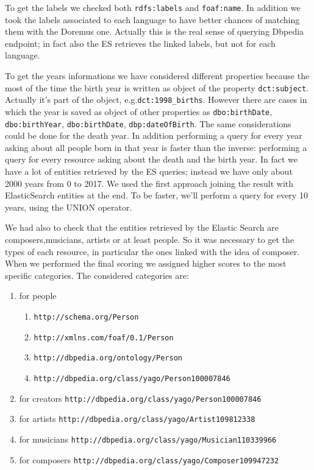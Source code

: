 \documentclass[paper=a4, fontsize=11pt]{scrartcl}
\begin{document}
To get the labels we checked both \verb|rdfs:labels| and \verb|foaf:name|. In addition we took the labels associated to each language to have better chances of matching them with the Doremus one. Actually this is the real sense of querying Dbpedia endpoint; in fact also the ES retrieves the linked labels, but not for each language.

To get the years informations we have considered different properties because the most of the time the birth year is written as object of the property \verb|dct:subject|. Actually it's part of the object, e.g.\verb|dct:1998_births|. However there are cases in which the year is saved as object of other properties as \verb|dbo:birthDate|, \verb|dbo:birthYear|,
\verb|dbo:birthDate|, \verb|dbp:dateOfBirth|.
The same considerations could be done for the death year.
In addition performing a query for every year asking about all people born in that year is faster than the inverse: performing a query for every resource asking about the death and the birth year. In fact we have a lot of entities retrieved by the ES queries; instead we have only about 2000 years from 0 to 2017. We used the first approach joining the result with ElasticSearch entities at the end.
To be faster, we'll perform a query for every 10 years, using the UNION operator.

We had also to check that the entities retrieved by the Elastic Search are composers,musicians, artists or at least people. So it was necessary to get the types of each resource, in particular the ones linked with the idea of composer. When we performed the final scoring we assigned higher scores to the most specific categories.
The considered categories are:

\begin{enumerate}

\item for people \begin{enumerate} \item \verb|http://schema.org/Person| \item \verb|http://xmlns.com/foaf/0.1/Person|\item \verb|http://dbpedia.org/ontology/Person|\item \verb|http://dbpedia.org/class/yago/Person100007846| \end{enumerate}

\item for creators  \verb|http://dbpedia.org/class/yago/Person100007846|

\item for artists \verb|http://dbpedia.org/class/yago/Artist109812338|

\item for musicians \verb|http://dbpedia.org/class/yago/Musician110339966|

\item for composers \verb|http://dbpedia.org/class/yago/Composer109947232|
\end{enumerate}
\end{document}
